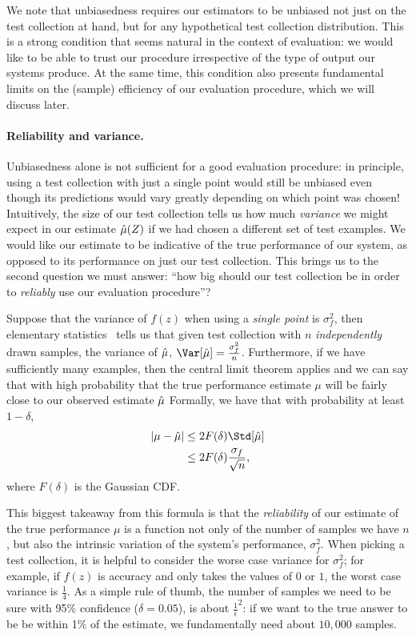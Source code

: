 We note that unbiasedness requires our estimators to be unbiased not just on the test collection at hand, but for any hypothetical test collection distribution.
This is a strong condition that seems natural in the context of evaluation: we would like to be able to trust our procedure irrespective of the type of output our systems produce.
At the same time, this condition also presents fundamental limits on the (sample) efficiency of our evaluation procedure, which we will discuss later.

\paragraph{Reliability and variance.}
Unbiasedness alone is not sufficient for a good evaluation procedure: in principle, using a test collection with just a single point would still be unbiased even though its predictions would vary greatly depending on which point was chosen!
Intuitively, the size of our test collection tells us how much \textit{variance} we might expect in our estimate $\hat{\mu}(Z)$ if we had chosen a different set of test examples.  
We would like our estimate to be indicative of the true performance of our system, as opposed to its performance on just our test collection.
This brings us to the second question we must answer: ``how big should our test collection be in order to \textit{reliably} use our evaluation procedure''?

Suppose that the variance of $f(z)$ when using a \textit{single point} is $\sigma^2_f$, then
elementary statistics~\cite{} tells us that given test collection with $n$ \textit{independently} drawn samples, the variance of $\hat{\mu}$, $\Var[\muh] = \frac{\sigma^2_f}{n}$.
Furthermore, if we have sufficiently many examples, then the central limit theorem applies and we can say that with high probability that the true performance estimate $\mu$ will be fairly close to our observed estimate $\hat{\mu}$
Formally, we have that with probability at least $1 - \delta$,
\begin{align*}
  |\mu - \muh| &\le 2F(\delta) \Std[\muh] \\
  &\le 2F(\delta) \frac{\sigma_f}{\sqrt{n}},
\end{align*}
where $F(\delta)$ is the Gaussian CDF.\@

This biggest takeaway from this formula is that the \textit{reliability} of our estimate of the true performance $\mu$ is a function not only of the number of samples we have $n$, but also the intrinsic variation of the system's performance, $\sigma^2_f$.
When picking a test collection, it is helpful to consider the worse case variance for $\sigma^2_f$; for example, if $f(z)$ is accuracy and only takes the values of $0$ or $1$, the worst case variance is $\frac{1}{4}$.
As a simple rule of thumb, the number of samples we need to be sure with 95\% confidence ($\delta = 0.05$), is about $\frac{1}{\epsilon}^2$: if we want to the true answer to be be within 1\% of the estimate, we fundamentally need about $10,000$ samples.


